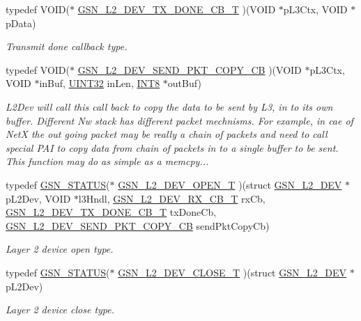 \begin{DoxyCompactItemize}
typedef VOID($\ast$ \hyperlink{a00670_ga4d5db18667f665fc99ec6171cf27b5be}{GSN\_\-L2\_\-DEV\_\-TX\_\-DONE\_\-CB\_\-T} )(VOID $\ast$pL3Ctx, VOID $\ast$pData)
\begin{DoxyCompactList}\small\item\em Transmit done callback type. \end{DoxyCompactList}\item 
typedef VOID($\ast$ \hyperlink{a00670_ga6c639d0fa9b75482d68bfa97834a0ca9}{GSN\_\-L2\_\-DEV\_\-SEND\_\-PKT\_\-COPY\_\-CB} )(VOID $\ast$pL3Ctx, VOID $\ast$inBuf, \hyperlink{a00660_gae1e6edbbc26d6fbc71a90190d0266018}{UINT32} inLen, \hyperlink{a00660_ga307b8734c020247f6bac4fcde0dcfbb9}{INT8} $\ast$outBuf)
\begin{DoxyCompactList}\small\item\em L2Dev will call this call back to copy the data to be sent by L3, in to its own buffer. Different Nw stack has different packet mechnisms. For example, in cae of NetX the out going packet may be really a chain of packets and need to call special PAI to copy data from chain of packets in to a single buffer to be sent. This function may do as simple as a memcpy... \end{DoxyCompactList}\item 
typedef \hyperlink{a00660_gada5951904ac6110b1fa95e51a9ddc217}{GSN\_\-STATUS}($\ast$ \hyperlink{a00670_gaea3ffbbb6ea57c5335f9011b4dcfe651}{GSN\_\-L2\_\-DEV\_\-OPEN\_\-T} )(struct \hyperlink{a00107}{GSN\_\-L2\_\-DEV} $\ast$pL2Dev, VOID $\ast$l3Hndl, \hyperlink{a00670_ga528d617c85be4b1aed82ce677f941587}{GSN\_\-L2\_\-DEV\_\-RX\_\-CB\_\-T} rxCb, \hyperlink{a00670_ga4d5db18667f665fc99ec6171cf27b5be}{GSN\_\-L2\_\-DEV\_\-TX\_\-DONE\_\-CB\_\-T} txDoneCb, \hyperlink{a00670_ga6c639d0fa9b75482d68bfa97834a0ca9}{GSN\_\-L2\_\-DEV\_\-SEND\_\-PKT\_\-COPY\_\-CB} sendPktCopyCb)
\begin{DoxyCompactList}\small\item\em Layer 2 device open type. \end{DoxyCompactList}\item 
typedef \hyperlink{a00660_gada5951904ac6110b1fa95e51a9ddc217}{GSN\_\-STATUS}($\ast$ \hyperlink{a00670_ga76681abc89c36ea37c57cedb070f1ec2}{GSN\_\-L2\_\-DEV\_\-CLOSE\_\-T} )(struct \hyperlink{a00107}{GSN\_\-L2\_\-DEV} $\ast$pL2Dev)
\begin{DoxyCompactList}\small\item\em Layer 2 device close type. \end{DoxyCompactList}\item 

\end{DoxyCompactItemize}
